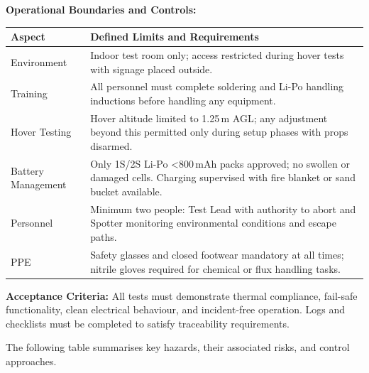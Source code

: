 \vspace{0.5em}
\textbf{Operational Boundaries and Controls:}

\begin{tabular}{|p{4cm}|p{11.5cm}|}
\hline
\rowcolor{gray!15}\textbf{Aspect} & \textbf{Defined Limits and Requirements} \\ \hline
Environment & Indoor test room only; access restricted during hover tests with signage placed outside. \\ \hline
Training & All personnel must complete soldering and Li-Po handling inductions before handling any equipment. \\ \hline
Hover Testing & Hover altitude limited to 1.25\,m AGL; any adjustment beyond this permitted only during setup phases with props disarmed. \\ \hline
Battery Management & Only 1S/2S Li-Po <800\,mAh packs approved; no swollen or damaged cells. Charging supervised with fire blanket or sand bucket available. \\ \hline
Personnel & Minimum two people: Test Lead with authority to abort and Spotter monitoring environmental conditions and escape paths. \\ \hline
PPE & Safety glasses and closed footwear mandatory at all times; nitrile gloves required for chemical or flux handling tasks. \\ \hline
\end{tabular}

\vspace{0.5em}
\textbf{Acceptance Criteria:} All tests must demonstrate thermal compliance, fail-safe functionality, clean electrical behaviour, and incident-free operation. Logs and checklists must be completed to satisfy traceability requirements.

The following table summarises key hazards, their associated risks, and control approaches.

